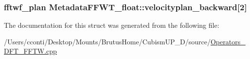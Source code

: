 \subsubsection[{velocityplan\+\_\+backward}]{\setlength{\rightskip}{0pt plus 5cm}fftwf\+\_\+plan Metadata\+F\+F\+W\+T\+\_\+float\+::velocityplan\+\_\+backward\mbox{[}2\mbox{]}}\label{struct_metadata_f_f_w_t__float_a9e2ff4e1a4bbf29bcfd38c908b615ed5}


The documentation for this struct was generated from the following file\+:\begin{DoxyCompactItemize}
\item 
/\+Users/cconti/\+Desktop/\+Mounts/\+Brutus\+Home/\+Cubism\+U\+P\+\_\+D/source/\hyperlink{_operators___d_f_t___f_f_t_w_8cpp}{Operators\+\_\+\+D\+F\+T\+\_\+\+F\+F\+T\+W.\+cpp}\end{DoxyCompactItemize}
